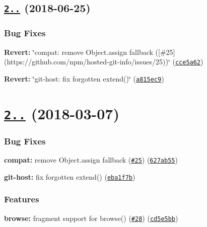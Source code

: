 \label{_2.6.1}%
 \subsection*{\href{https://github.com/npm/hosted-git-info/compare/v2.6.0...v2.6.1}{\tt 2..} (2018-\/06-\/25)}

\subsubsection*{Bug Fixes}


\begin{DoxyItemize}
\item {\bfseries Revert\+:} \char`\"{}compat\+: remove Object.\+assign fallback (\mbox{[}\#25\mbox{]}(https\+://github.\+com/npm/hosted-\/git-\/info/issues/25))\char`\"{} (\href{https://github.com/npm/hosted-git-info/commit/cce5a62}{\tt cce5a62})
\item {\bfseries Revert\+:} \char`\"{}git-\/host\+: fix forgotten extend()\char`\"{} (\href{https://github.com/npm/hosted-git-info/commit/a815ec9}{\tt a815ec9})
\end{DoxyItemize}

\label{_2.6.0}%
 \section*{\href{https://github.com/npm/hosted-git-info/compare/v2.5.0...v2.6.0}{\tt 2..} (2018-\/03-\/07)}

\subsubsection*{Bug Fixes}


\begin{DoxyItemize}
\item {\bfseries compat\+:} remove Object.\+assign fallback (\href{https://github.com/npm/hosted-git-info/issues/25}{\tt \#25}) (\href{https://github.com/npm/hosted-git-info/commit/627ab55}{\tt 627ab55})
\item {\bfseries git-\/host\+:} fix forgotten extend() (\href{https://github.com/npm/hosted-git-info/commit/eba1f7b}{\tt eba1f7b})
\end{DoxyItemize}

\subsubsection*{Features}


\begin{DoxyItemize}
\item {\bfseries browse\+:} fragment support for browse() (\href{https://github.com/npm/hosted-git-info/issues/28}{\tt \#28}) (\href{https://github.com/npm/hosted-git-info/commit/cd5e5bb}{\tt cd5e5bb}) 
\end{DoxyItemize}